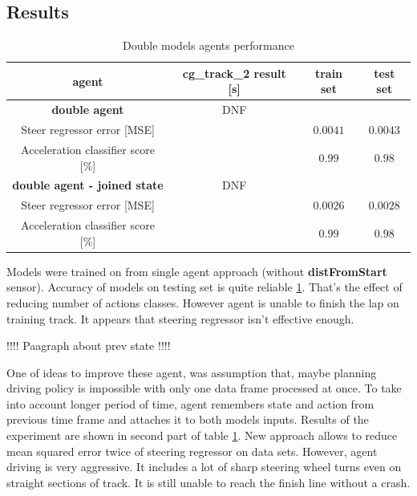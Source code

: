 \documentclass[declaration,shortabstract,english,inz]{iithesis}
\begin{document}
\subsection{Results}

\begin{table}[h]
    \centering
    \begin{tabular}{ |c|c|c|c|}
          \hline
          agent & cg\_track\_2 result [s] & train set & test set \\
          \hline
          \textbf{double agent} & DNF &   &  \\
          \hline
          Steer regressor error [MSE]&   & $0.0041$ & $0.0043$\\
          \hline
          Acceleration classifier score [\%]&  & $0.99$ & $0.98$ \\
          \hline
          \textbf{double agent - joined state} & DNF &   &  \\
          \hline
          Steer regressor error [MSE]&   & $0.0026$ & $0.0028$\\
          \hline
          Acceleration classifier score [\%]&  & $0.99$ & $0.98$ \\
          \hline
          
        \end{tabular}
        \caption{Double models agents performance}
        \label{tab:double_models_results}

\end{table}


Models were trained on from single agent approach (without \textbf{distFromStart} sensor). Accuracy of models on testing set is quite reliable \ref{tab:double_models_results}. That's the effect of reducing number of actions classes. However agent is unable to finish the lap on training track. It appears that steering regressor isn't effective enough. 

!!!! Paagraph about prev state !!!!

One of ideas to improve these agent, was assumption that, maybe planning driving policy is impossible with only one data frame processed at once. To take into account longer period of time, agent remembers state and action from previous time frame and attaches it to both models inputs. Results of the experiment are shown in second part of table \ref{tab:double_models_results}. New approach allows to reduce mean squared error twice of steering regressor on data sets. However, agent driving is very aggressive. It includes a lot of sharp steering wheel turns even on straight sections of track. It is still unable to reach the finish line without a crash.
\end{document}
